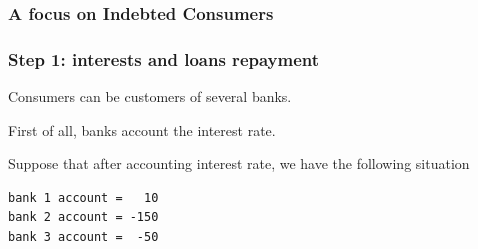 \documentclass{article}
\begin{document}

\subsubsection{A focus on Indebted Consumers}
\subsubsection*{Step 1: interests and loans repayment}

Consumers can be customers of several banks.

First of all, banks account the interest rate.

Suppose that after accounting interest rate, we have the following situation
\begin{verbatim}
bank 1 account =   10
bank 2 account = -150
bank 3 account =  -50
\end{verbatim}
\end{document}
